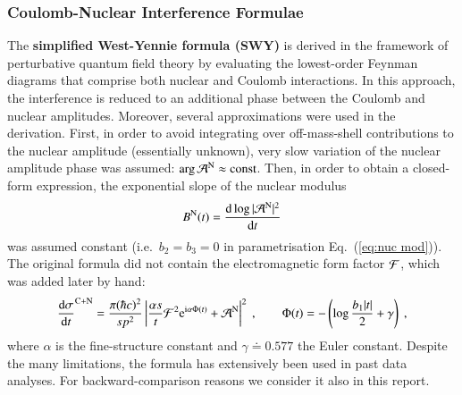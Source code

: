 \subsubsection{Coulomb-Nuclear Interference Formulae}
\label{sec:cni interference}

The {\bf simplified West-Yennie formula (SWY)} \cite{wy68} is derived in the framework of perturbative quantum field theory by evaluating the lowest-order Feynman diagrams that comprise both nuclear and Coulomb interactions. In this approach, the interference is reduced to an additional phase between the Coulomb and nuclear amplitudes. Moreover, several approximations were used in the derivation. First, in order to avoid integrating over off-mass-shell contributions to the nuclear amplitude (essentially unknown), very slow variation of the nuclear amplitude phase was assumed: $\arg {\cal A}^{\rm N} \approx \hbox{const}$. Then, in order to obtain a closed-form expression, the exponential slope of the nuclear modulus
\begin{equation}
\label{eq:nuc slope}
B^{\rm N}(t) = {\d \log |{\cal A}^{\rm N}|^2 \over \d t}
\end{equation}
was assumed constant (i.e.~$b_2 = b_3 = 0$ in parametrisation Eq.~(\ref{eq:nuc mod})). The original formula did not contain the electromagnetic form factor ${\cal F}$, which was added later by hand:
\begin{equation}
\label{eq:int swy}
	{\d\sigma\over \d t}^{\rm C+N} = {\pi (\hbar c)^2 \over s p^2} \left | {\alpha s\over t} {\cal F}^2 \e^{\I\alpha \Phi(t)} + {\cal A}^{\rm N} \right |^2\ ,\qquad
	\Phi(t) = - \left( \log {b_1 |t|\over 2} + \gamma \right)\ ,
\end{equation}
where $\alpha$ is the fine-structure constant and $\gamma \doteq 0.577$ the Euler constant. Despite the many limitations, the formula has extensively been used in past data analyses. For backward-comparison reasons we consider it also in this report.


